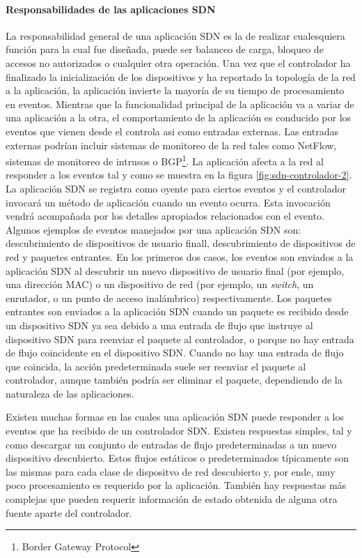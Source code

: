 \documentclass[10pt,journal,compsoc]{IEEEtran}
\begin{document}
\paragraph{Responsabilidades de las aplicaciones SDN}
La responsabilidad general de una aplicación SDN es la de realizar cualesquiera función para la cual fue diseñada, puede ser balanceo de carga, bloqueo de accesos no autorizados o cualquier otra operación. Una vez que el controlador ha finalizado la inicialización de los dispositivos y ha reportado la topología de la red a la aplicación, la aplicación invierte la mayoría de su tiempo de procesamiento en eventos. Mientras que la funcionalidad principal de la aplicación va a variar de una aplicación a la otra, el comportamiento de la aplicación es conducido por los eventos que vienen desde el controla asi como entradas externas. Las entradas externas podrían incluir sistemas de monitoreo de la red tales como NetFlow, sistemas de monitoreo de intrusos o BGP\footnote{Border Gateway Protocol}. La aplicación afecta a la red al responder a los eventos tal y como se muestra en la figura \ref{fig:sdn-controlador-2}. La aplicación SDN se registra como oyente para ciertos eventos y el controlador invocará un método de aplicación cuando un evento ocurra. Esta invocación vendrá acompañada por los detalles apropiados relacionados con el evento. Algunos ejemplos de eventos manejados por una aplicación SDN son: descubrimiento de dispositivos de usuario finall, descubrimiento de dispositivos de red y paquetes entrantes. En los primeros dos casos, los eventos son enviados a la aplicación SDN al descubrir un nuevo dispositivo de usuario final (por ejemplo, una dirección MAC) o un dispositivo de red (por ejemplo, un \emph{switch}, un enrutador, o un punto de acceso inalámbrico) respectivamente. Los paquetes entrantes son enviados a la aplicación SDN cuando un paquete es recibido desde un dispositivo SDN ya sea debido a una entrada de flujo que instruye al dispositivo SDN para reenviar el paquete al controlador, o porque no hay entrada de flujo coincidente en el dispositivo SDN. Cuando no hay una entrada de flujo que coincida, la acción predeterminada suele ser reenviar el paquete al controlador, aunque también podría ser eliminar el paquete, dependiendo de la naturaleza de las aplicaciones.

Existen muchas formas en las cuales una aplicación SDN puede responder a los eventos que ha recibido de un controlador SDN. Existen respuestas simples, tal y como descargar un conjunto de entradas de flujo predeterminadas a un nuevo dispositivo descubierto. Estos flujos estáticos o predeterminados típicamente son las mismas para cada clase de dispositvo de red descubierto y, por ende, muy poco procesamiento es requerido por la aplicación. También hay respuestas más complejas que pueden requerir información de estado obtenida de alguna otra fuente aparte del controlador.
\end{document}
